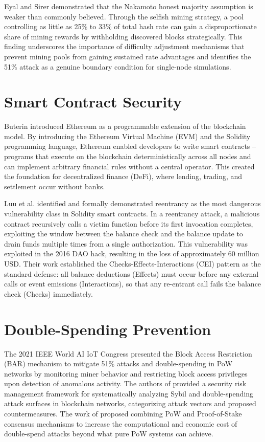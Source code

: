\documentclass[12pt,a4paper]{report}
\begin{document}
Eyal and Sirer \cite{eyal2014} demonstrated that the Nakamoto honest majority assumption
is weaker than commonly believed. Through the selfish mining strategy, a pool controlling
as little as 25\% to 33\% of total hash rate can gain a disproportionate share of mining
rewards by withholding discovered blocks strategically. This finding underscores the
importance of difficulty adjustment mechanisms that prevent mining pools from gaining
sustained rate advantages and identifies the 51\% attack as a genuine boundary condition
for single-node simulations.

\section{Smart Contract Security}

Buterin \cite{buterin2014} introduced Ethereum as a programmable extension of the
blockchain model. By introducing the Ethereum Virtual Machine (EVM) and the Solidity
programming language, Ethereum enabled developers to write smart contracts -- programs
that execute on the blockchain deterministically across all nodes and can implement
arbitrary financial rules without a central operator. This created the foundation for
decentralized finance (DeFi), where lending, trading, and settlement occur without banks.

Luu et al. \cite{luu2016} identified and formally demonstrated reentrancy as the most
dangerous vulnerability class in Solidity smart contracts. In a reentrancy attack, a
malicious contract recursively calls a victim function before its first invocation
completes, exploiting the window between the balance check and the balance update to drain
funds multiple times from a single authorization. This vulnerability was exploited in the
2016 DAO hack, resulting in the loss of approximately 60 million USD. Their work
established the Checks-Effects-Interactions (CEI) pattern as the standard defense:
all balance deductions (Effects) must occur before any external calls or event emissions
(Interactions), so that any re-entrant call fails the balance check (Checks) immediately.

\section{Double-Spending Prevention}

The 2021 IEEE World AI IoT Congress \cite{ieee2021bar} presented the Block Access
Restriction (BAR) mechanism to mitigate 51\% attacks and double-spending in PoW networks
by monitoring miner behavior and restricting block access privileges upon detection of
anomalous activity. The authors of \cite{ieee2021sybil} provided a security risk
management framework for systematically analyzing Sybil and double-spending attack surfaces
in blockchain networks, categorizing attack vectors and proposed countermeasures.
The work of \cite{mdpi2021hybrid} proposed combining PoW and Proof-of-Stake consensus
mechanisms to increase the computational and economic cost of double-spend attacks beyond
what pure PoW systems can achieve.
\end{document}
